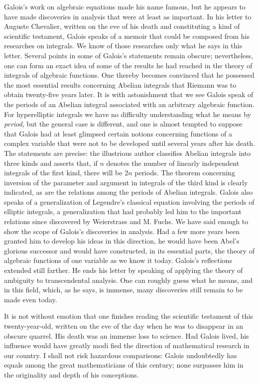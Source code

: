 Galois's work on algebraic equations made his name famous, but he appears to
have made discoveries in analysis that were at least as important. In his
letter to Auguste Chevalier, written on the eve of his death and constituting a
kind of scientific testament, Galois speaks of a memoir that could be composed
from his researches on integrals. We know of those researches only what he
says in this letter. Several points in some of Galois's statements remain
obscure; nevertheless, one can form an exact idea of some of the results he
had reached in the theory of integrals of algebraic functions. One thereby
becomes convinced that he possessed the most essential results concerning
Abelian integrals that Riemann was to obtain twenty-five years later. It is
with astonishment that we see Galois speak of the periods of an Abelian
integral associated with an arbitrary algebraic function. For hyperelliptic
integrals we have no difficulty understanding what he means by \emph{period},
but the general case is different, and%
%
one is almost tempted to suppose that Galois had at least glimpsed certain
notions concerning functions of a complex variable that were not to be
developed until several years after his death. The statements are precise:
the illustrious author classifies Abelian integrals into three kinds and
asserts that, if $n$ denotes the number of linearly independent integrals of
the first kind, there will be $2n$ periods. The theorem concerning inversion
of the parameter and argument in integrals of the third kind is clearly
indicated, as are the relations among the periods of Abelian integrals. Galois
also speaks of a generalization of Legendre's classical equation involving
the periods of elliptic integrals, a generalization that had probably led him
to the important relations since discovered by Weierstrass and M. Fuchs. We
have said enough to show the scope of Galois's discoveries in analysis. Had a
few more years been granted him to develop his ideas in this direction, he
would have been Abel's glorious successor and would have constructed, in its
essential parts, the theory of algebraic functions of one variable as we know
it today. Galois's reflections extended still farther. He ends his letter by
speaking of applying the theory of ambiguity to transcendental analysis. One
can roughly guess what he means, and in this field, which, as he says, is
immense, many discoveries still remain to be made even today.

It is not without emotion that one finishes reading the scientific testament
of this twenty-year-old, written on the eve of the day when he was to disappear
in an obscure quarrel. His death was an immense loss to science. Had Galois
lived, his influence would have greatly modi%
%
fied the direction of mathematical research in our country. I shall not risk
hazardous comparisons: Galois undoubtedly has equals among the great
mathematicians of this century; none surpasses him in the originality and
depth of his conceptions.

